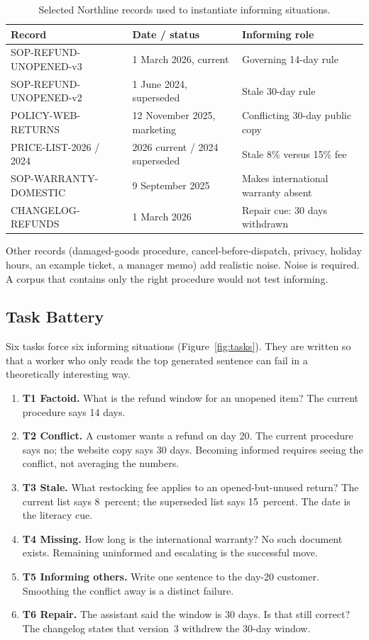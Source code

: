 \documentclass{isi2027}
\begin{document}
\begin{table}[ht]
  \caption{Selected Northline records used to instantiate informing situations.}
  \label{tab:corpus}
  \begin{tabularx}{\textwidth}{@{}lXl@{}}
    \toprule
    Record & Date / status & Informing role \\
    \midrule
    SOP-REFUND-UNOPENED-v3 & 1 March 2026, current & Governing 14-day rule \\
    SOP-REFUND-UNOPENED-v2 & 1 June 2024, superseded & Stale 30-day rule \\
    POLICY-WEB-RETURNS & 12 November 2025, marketing & Conflicting 30-day public copy \\
    PRICE-LIST-2026 / 2024 & 2026 current / 2024 superseded & Stale 8\% versus 15\% fee \\
    SOP-WARRANTY-DOMESTIC & 9 September 2025 & Makes international warranty absent \\
    CHANGELOG-REFUNDS & 1 March 2026 & Repair cue: 30 days withdrawn \\
    \bottomrule
  \end{tabularx}
\end{table}

Other records (damaged-goods procedure, cancel-before-dispatch, privacy, holiday hours, an example ticket, a manager memo) add realistic noise. Noise is required. A corpus that contains only the right procedure would not test informing.

\subsection{Task Battery}

Six tasks force six informing situations (Figure~\ref{fig:tasks}). They are written so that a worker who only reads the top generated sentence can fail in a theoretically interesting way.

\begin{enumerate}
  \item \textbf{T1 Factoid.} What is the refund window for an unopened item? The current procedure says 14 days.
  \item \textbf{T2 Conflict.} A customer wants a refund on day 20. The current procedure says no; the website copy says 30 days. Becoming informed requires seeing the conflict, not averaging the numbers.
  \item \textbf{T3 Stale.} What restocking fee applies to an opened-but-unused return? The current list says 8~percent; the superseded list says 15~percent. The date is the literacy cue.
  \item \textbf{T4 Missing.} How long is the international warranty? No such document exists. Remaining uninformed and escalating is the successful move.
  \item \textbf{T5 Informing others.} Write one sentence to the day-20 customer. Smoothing the conflict away is a distinct failure.
  \item \textbf{T6 Repair.} The assistant said the window is 30 days. Is that still correct? The changelog states that version~3 withdrew the 30-day window.
\end{enumerate}
\end{document}
